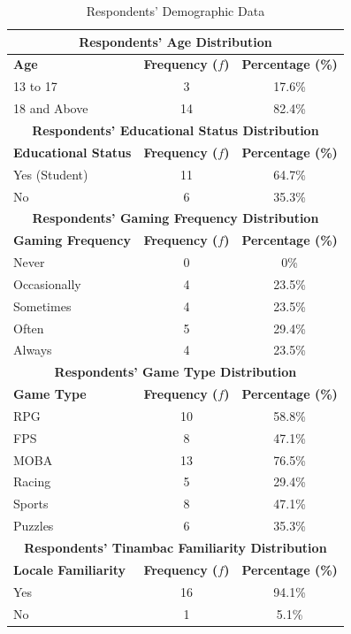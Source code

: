 \documentclass{research}
\begin{document}
\begin{table}[h!]
\centering
\caption{Respondents' Demographic Data}
\label{tab:demographics}
\begin{tabular}{lcc}
\toprule
\multicolumn{3}{c}{\textbf{Respondents' Age Distribution}} \\
\midrule
\textbf{Age}              & \textbf{Frequency ($f$)} & \textbf{Percentage (\%)} \\
\midrule
13 to 17                  & 3  & 17.6\% \\
18 and Above              & 14 & 82.4\% \\
\midrule
\multicolumn{3}{c}{\textbf{Respondents' Educational Status Distribution}} \\
\midrule
\textbf{Educational Status} & \textbf{Frequency ($f$)} & \textbf{Percentage (\%)} \\
\midrule
Yes (Student)             & 11 & 64.7\% \\
No                        & 6  & 35.3\% \\
\midrule
\multicolumn{3}{c}{\textbf{Respondents' Gaming Frequency Distribution}} \\
\midrule
\textbf{Gaming Frequency} & \textbf{Frequency ($f$)} & \textbf{Percentage (\%)} \\
\midrule
Never                     & 0  & 0\%    \\
Occasionally              & 4  & 23.5\% \\
Sometimes                 & 4  & 23.5\% \\
Often                     & 5  & 29.4\% \\
Always                    & 4  & 23.5\% \\
\midrule
\multicolumn{3}{c}{\textbf{Respondents' Game Type Distribution}} \\
\midrule
\textbf{Game Type}        & \textbf{Frequency ($f$)} & \textbf{Percentage (\%)} \\
\midrule
RPG                       & 10 & 58.8\% \\
FPS                       & 8  & 47.1\% \\
MOBA                      & 13 & 76.5\% \\
Racing                    & 5  & 29.4\% \\
Sports                    & 8  & 47.1\% \\
Puzzles                   & 6  & 35.3\% \\
\midrule
\multicolumn{3}{c}{\textbf{Respondents' Tinambac Familiarity Distribution}} \\
\midrule
\textbf{Locale Familiarity} & \textbf{Frequency ($f$)} & \textbf{Percentage (\%)} \\
\midrule
Yes                       & 16 & 94.1\% \\
No                        & 1  & 5.1\%  \\
\bottomrule
\end{tabular}
\end{table}
\end{document}
